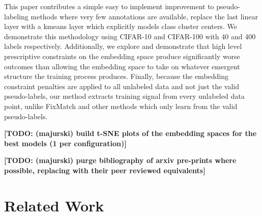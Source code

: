 \documentclass[10pt,twocolumn,letterpaper]{article}
\newcommand{\TODO}[1]{\textbf{\color{red}[TODO: #1]}}
\begin{document}
This paper contributes a simple easy to implement improvement to pseudo-labeling methods where very few annotations are available, replace the last linear layer with a kmeans layer which explicitly models class cluster centers.
We demonstrate this methodology using CIFAR-10 and CIFAR-100 \cite{cifar10} with 40 and 400 labels respectively. 
Additionally, we explore and demonstrate that high level prescriptive constraints on the embedding space produce significantly worse outcomes than allowing the embedding space to take on whatever emergent structure the training process produces. 
Finally, because the embedding constraint penalties are applied to all unlabeled data and not just the valid pseudo-labels, our method extracts training signal from every unlabeled data point, unlike FixMatch \cite{sohn2020fixmatch} and other methods which only learn from the valid pseudo-labels.




\TODO {(majurski) build t-SNE plots of the embedding spaces for the best models (1 per configuration)}

\TODO {(majurski) purge bibliography of arxiv pre-prints where possible, replacing with their peer reviewed equivalents}






\section{Related Work}
\end{document}
